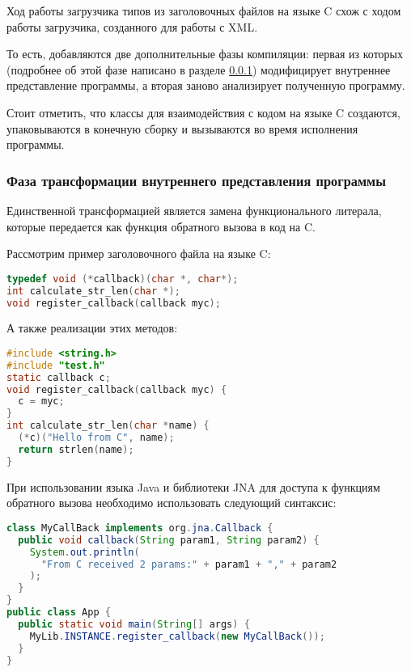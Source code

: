 Ход работы загрузчика типов из заголовочных файлов на языке C схож с ходом работы загрузчика, созданного для работы с XML.

То есть, добавляются две дополнительные фазы компиляции: первая из которых (подробнее об этой фазе написано в разделе \ref{c-tranformation-phase}) модифицирует внутреннее представление программы, а вторая заново анализирует полученную программу.

Стоит отметить, что классы для взаимодействия с кодом на языке C создаются, упаковываются в конечную сборку и вызываются во время исполнения программы.

\subsubsection{Фаза трансформации внутреннего представления программы}\label{c-tranformation-phase}
Единственной трансформацией является замена функционального литерала, которые передается как функция обратного вызова в код на C.

Рассмотрим пример заголовочного файла на языке C:

\begin{lstlisting}[language=C, caption={Пример заголовочного файла на языке C с декларацией функции обратного вызова.}, label=callback-c-example]
typedef void (*callback)(char *, char*);
int calculate_str_len(char *);
void register_callback(callback myc);
\end{lstlisting}

А также реализации этих методов:
\begin{lstlisting}[language=C, caption={Реализация функции обратного вызова из примера~\ref{callback-c-example}.}, label=callback-c-example-impl]
#include <string.h>
#include "test.h"
static callback c;
void register_callback(callback myc) {
  c = myc;
}
int calculate_str_len(char *name) {
  (*c)("Hello from C", name);
  return strlen(name);
}
\end{lstlisting}

При использовании языка Java и библиотеки JNA для доступа к функциям обратного вызова необходимо использовать следующий синтаксис:
\begin{lstlisting}[language=Java, caption={Пример передачи функции обратного вызова в языке Java с использованием библиотеки JNA.}, label=java-callback-example]
class MyCallBack implements org.jna.Callback {
  public void callback(String param1, String param2) {
    System.out.println(
      "From C received 2 params:" + param1 + "," + param2
    );
  }
}
public class App {
  public static void main(String[] args) {
    MyLib.INSTANCE.register_callback(new MyCallBack());
  }
}
\end{lstlisting}

